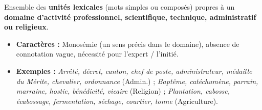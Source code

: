\documentclass[11pt]{article}
\begin{document}
\begin{definition}
Ensemble des \textbf{unités lexicales} (mots simples ou composés) propres à un \textbf{domaine d'activité professionnel, scientifique, technique, administratif ou religieux}.
\begin{itemize}
    \item \textbf{Caractères :} Monosémie (un sens précis dans le domaine), absence de connotation vague, nécessité pour l'expert / l'initié.
    \item \textbf{Exemples :} \emph{Arrêté, décret, canton, chef de poste, administrateur, médaille du Mérite, chevalier, ordonnance} (Admin.) ; \emph{Baptême, catéchumène, parrain, marraine, hostie, bénédicité, vicaire} (Religion) ; \emph{Plantation, cabosse, écabossage, fermentation, séchage, courtier, tonne} (Agriculture).
\end{itemize}
\end{definition}
\end{document}
